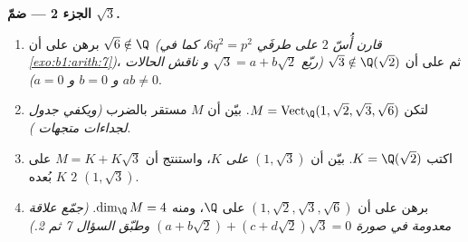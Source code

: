 \begin{problem}
\medskip
\noindent\textbf{الجزء 2 --- ضمّ $\sqrt3$.}
\begin{enumerate}[resume]
  \item برهن على أن $\sqrt6 \notin \Q$ \emph{(قارن أُسّ
        $2$ على طرفَي $6q^2 = p^2$، كما في
        \cref{exo:b1:arith:7})}، ثم على أن $\sqrt3 \notin
        \Q(\sqrt2)$ \emph{(ربّع $\sqrt3 = a + b\sqrt2$ و
        ناقش الحالات $ab \neq 0$ و $b = 0$ و $a = 0$)}.
  \item لتكن $M = \operatorname{Vect}_\Q(1, \sqrt2, \sqrt3,
        \sqrt6)$. بيّن أن $M$ مستقر بالضرب
        \emph{(ويكفي جدول لجداءات متجهات )}.
  \item اكتب $K = \Q(\sqrt2)$. بيّن أن $(1, \sqrt3)$ 
        \emph{على  $K$}، واستنتج أن $M = K +
        K\sqrt3$  على $K$ بُعده $2$
         $(1, \sqrt3)$.
  \item برهن على أن $(1, \sqrt2, \sqrt3, \sqrt6)$  على
        $\Q$، ومنه $\dim_\Q M = 4$. \emph{(جمّع علاقة معدومة
        في صورة $(a + b\sqrt2) + (c + d\sqrt2)\sqrt3 = 0$ وطبّق
        السؤال 7 ثم 2.)}
\end{enumerate}


\end{problem}
